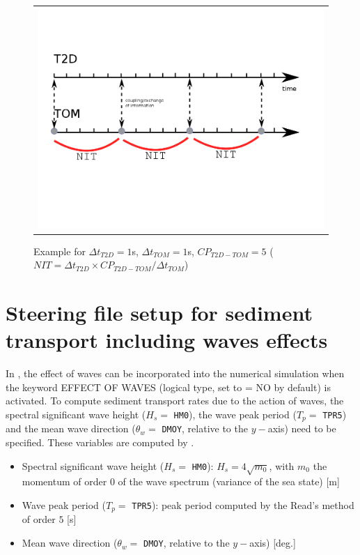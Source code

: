 \begin{figure}[H]%
  \begin{center}
    \begin{tabular}{c}
      \includegraphics[scale=0.30]{./graphics/coupling_2.png}
    \end{tabular}
    \caption{Example for $\Delta t_{T2D}=1$s, $\Delta t_{TOM}=1$s, $CP_{T2D-TOM}=5$ ($NIT=\Delta t_{T2D}\times CP_{T2D-TOM}/\Delta t_{TOM}$)}
\end{center}
\end{figure}

\section{Steering file setup for sediment transport including waves effects}
In \sisyphe{}, the effect of waves can be incorporated into the numerical simulation when the keyword 
{\ttfamily EFFECT OF WAVES} (logical type, set to {\ttfamily = NO} by default) is activated. To compute sediment transport rates due to the action of waves, the spectral significant wave height ($H_s =$ \texttt{HM0}), the wave peak period ($T_p =$ \texttt{TPR5}) and the mean wave direction ($\theta_w =$ \texttt{DMOY}, relative to the $y-$axis) need to be specified. These variables are computed by \tomawac{}.

\begin{itemize}
\item Spectral significant wave height ($H_s =$ \texttt{HM0}): $H_s=4\sqrt{m_0}$, with $m_0$ the momentum of order $0$ of the wave spectrum (variance of the sea state) [m]
\vspace{0.2cm}
\item Wave peak period ($T_p =$ \texttt{TPR5}): peak period computed by the Read's method of order $5$ [s] 
\vspace{0.2cm}
\item Mean wave direction ($\theta_w =$ \texttt{DMOY}, relative to the $y-$axis) [deg.] 
\end{itemize}



